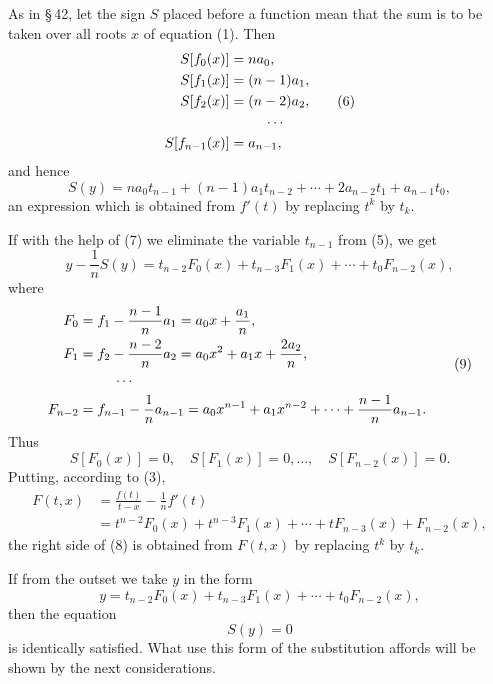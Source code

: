 \documentclass[11pt]{article}
\begin{document}
As in \S\,42, let the sign $S$ placed before a function mean that the sum is to be taken over all roots $x$ of equation (1). Then
\begin{equation}
\begin{aligned}
 S[f_0(x)]&=na_0,\\
 S[f_1(x)]&=(n-1)a_1,\\
 S[f_2(x)]&=(n-2)a_2,\\
 &\hspace{2.5em}\cdots\\
 S[f_{n-1}(x)]&=a_{n-1},
\end{aligned}
\tag{6}
\end{equation}
and hence
\begin{equation}
 S(y)=na_0t_{n-1}+(n-1)a_1t_{n-2}+\cdots+2a_{n-2}t_1+a_{n-1}t_0,
\tag{7}
\end{equation}
an expression which is obtained from $f'(t)$ by replacing $t^k$ by $t_k$.

If with the help of (7) we eliminate the variable $t_{n-1}$ from (5), we get
\begin{equation}
 y-\frac1nS(y)=t_{n-2}F_0(x)+t_{n-3}F_1(x)+\cdots+t_0F_{n-2}(x),
\tag{8}
\end{equation}
where
\begin{equation}
\begin{aligned}
 F_0&=f_1-\frac{n-1}{n}a_1=a_0x+\frac{a_1}{n},\\
 F_1&=f_2-\frac{n-2}{n}a_2=a_0x^2+a_1x+\frac{2a_2}{n},\\
 &\hspace{2.5em}\cdots\\
 F_{n-2}&=f_{n-1}-\frac1n a_{n-1}=a_0x^{n-1}+a_1x^{n-2}+\cdots+\frac{n-1}{n}a_{n-1}.
\end{aligned}
\tag{9}
\end{equation}
Thus
\begin{equation}
 S[F_0(x)]=0,
 \quad S[F_1(x)]=0,
 \ldots,
 \quad S[F_{n-2}(x)]=0.
\tag{10}
\end{equation}
Putting, according to (3),
\begin{equation}
\begin{aligned}
 F(t,x)&=\frac{f(t)}{t-x}-\frac1n f'(t)\\
 &=t^{n-2}F_0(x)+t^{n-3}F_1(x)+\cdots+tF_{n-3}(x)+F_{n-2}(x),
\end{aligned}
\tag{11}
\end{equation}
the right side of (8) is obtained from $F(t,x)$ by replacing $t^k$ by $t_k$.

If from the outset we take $y$ in the form
\begin{equation}
 y=t_{n-2}F_0(x)+t_{n-3}F_1(x)+\cdots+t_0F_{n-2}(x),
\tag{12}
\end{equation}
then the equation
\begin{equation}
 S(y)=0
\tag{13}
\end{equation}
is identically satisfied. What use this form of the substitution affords will be shown by the next considerations.
\end{document}
